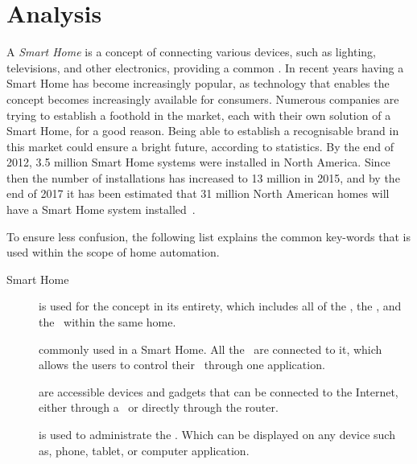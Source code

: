 \chapter{Analysis} \label{cha:analysis}

A \textit{Smart Home} is a concept of connecting various devices, such as lighting, televisions, and other electronics, providing a common \phone. In recent years having a Smart Home has become increasingly popular, as technology that enables the concept becomes increasingly available for consumers. Numerous companies are trying to establish a foothold in the market, each with their own solution of a Smart Home, for a good reason. Being able to establish a recognisable brand in this market could ensure a bright future, according to statistics. By the end of 2012, 3.5 million Smart Home systems were installed in North America. Since then the number of installations has increased to 13 million in 2015, and by the end of 2017 it has been estimated that 31 million North American homes will have a Smart Home system installed~\citep{statista-na-estimation}.

To ensure less confusion, the following list explains the common key-words that is used within the scope of home automation.
\begin{description}
\item[Smart Home] is used for the concept in its entirety, which includes all of the \sdevs, the \hub, and the \phone~within the same home.
\item[\Hub] commonly used in a Smart Home. All the \sdevs~are connected to it, which allows the users to control their \sdevs~through one application.
\item[\SDevs] are accessible devices and gadgets that can be connected to the Internet, either through a \hub~or directly through the router.
\item[\Phone] is used to administrate the \sdevs. Which can be displayed on any device such as, phone, tablet, or computer application.
\end{description}


 









